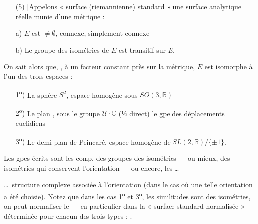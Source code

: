 \documentclass[11pt,a4paper]{article}
\begin{document}
\begin{itemize}
  \item[(5)] [Appelons \struck{\ill{}} « surface (riemannienne) standard » une
    surface \struck{$E$} analytique réelle munie d'une métrique
    \add{riemannienne $\geqslant 0$} \struck{telle que} :
\end{itemize}

\begin{itemize}
  \item[a)] $E$ est $\neq \emptyset$, connexe, simplement connexe
  \item[b)] Le groupe des isométries de $E$ est transitif sur $E$.
\end{itemize}

On sait alors que, \ill{}, à un facteur constant près sur la métrique, $E$ est
isomorphe à l'un des trois espaces \ill{} :

\begin{itemize}
  \item[1\textsuperscript{o})] La sphère $S^2$, espace homogène sous
    $SO(3,\mathbb{R})$  \ill{}
  \item[2\textsuperscript{o})] Le plan  , sous
    le groupe $\mathcal{U}\cdot\mathbb{C}$ (½ direct) le gpe des déplacements
    euclidiens
  \item[3\textsuperscript{o})] Le demi-plan de Poincaré,
     espace homogène de $SL(2,\mathbb{R})/\{\pm 1\}$.
\end{itemize}





Les gpes écrits sont les comp.   des groupes des
isométries — ou mieux, des isométries qui conservent l'orientation — ou encore,
les \ldots


\ldots\ structure complexe associée à l'orientation (dans le cas où une telle
orientation a été choisie). Notez que dans les cas 1\textsuperscript{o} et
3\textsuperscript{o}, \struck{\ill{}} les similitudes sont des isométries, on
peut normaliser le  — en particulier dans la « surface
standard normalisée » — déterminée pour chacun des  trois types :
.
\end{document}
